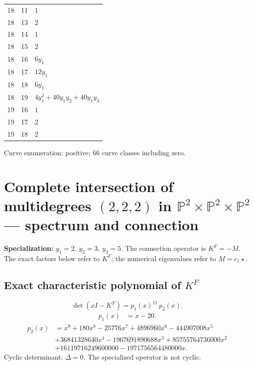 \documentclass[10pt,a4paper]{article}
\begin{document}
{\begin{longtable}{rrp{125mm}}
18 & 11 & $1$\\
18 & 13 & $2$\\
18 & 14 & $1$\\
18 & 15 & $2$\\
18 & 16 & $6 y_{1}$\\
18 & 17 & $12 y_{1}$\\
18 & 18 & $6 y_{1}$\\
18 & 19 & $4 y_{1}^{2} + 40 y_{1} y_{2} + 40 y_{1} y_{3}$\\
19 & 16 & $1$\\
19 & 17 & $2$\\
19 & 18 & $2$\\
\end{longtable}}
Curve enumeration: positive; 66 curve classes including zero.
\clearpage\section*{Complete intersection of multidegrees $(2,2,2)$ in $\mathbb P^{2}\times \mathbb P^{2}\times \mathbb P^{2}$ --- spectrum and connection}
\textbf{Specialization:} $y_1=2,\ y_2=3,\ y_3=5$. The connection operator is $K^F=-M$. The exact factors below refer to $K^F$; the numerical eigenvalues refer to $M=c_1\star$.
\subsection*{Exact characteristic polynomial of $K^F$}
\[\det(xI-K^F)=p_{1}(x)^{11}\,p_{2}(x).\]
\[\begin{aligned}p_{1}(x)&=x - 20.\end{aligned}\]
\[\begin{aligned}p_{2}(x)&=x^{9} + 180 x^{8} - 25776 x^{7} + 4896960 x^{6} - 444907008 x^{5}\\&+36841328640 x^{4} - 1967691890688 x^{3} + 85755764736000 x^{2}\\&+16119716249600000 - 1971756564480000 x.\end{aligned}\]
Cyclic determinant: $\Delta=0$. The specialized operator is not cyclic.
\end{document}
